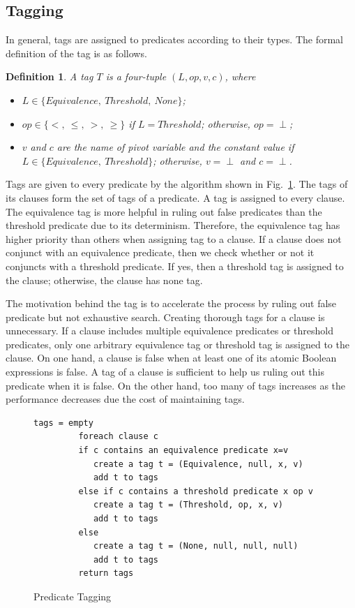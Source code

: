 \documentclass[preprint]{sigplanconf}
\newtheorem{definition}{Definition}
\begin{document}
\subsection{Tagging}
In general, tags are assigned to predicates according to their types. The 
formal definition of the tag is as follows. 
\begin{definition}
   A tag $T$ is a four-tuple $(L, op, v, c)$, where  
   \begin{itemize}
      \item $L \in \{Equivalence,\ Threshold,\ None\}$;
      \item $op \in \{<,\ \le,\ >,\ \ge\}$ if $L = Threshold$; otherwise, 
         $op = \perp$;
      \item $v$ and $c$ are the name of pivot variable and the constant
         value if $L \in \{Equivalence,\ Threshold\}$; otherwise, $v = \perp$
         and $c = \perp$.
   \end{itemize}
\end{definition}
Tags are given to every predicate by the algorithm shown in
Fig.~\ref{fig:tagging}. The tags of its clauses form the set of tags of a
predicate. A tag is assigned to every clause. The equivalence tag is more
helpful in ruling out false predicates than the threshold predicate due to its
determinism. Therefore, the equivalence tag has higher priority than others 
when assigning tag to a clause. If a clause does not conjunct with an
equivalence predicate, then we check whether or not it conjuncts with a 
threshold predicate. If yes, then a threshold tag is assigned to the clause; 
otherwise, the clause has none tag. 

The motivation behind the tag is to accelerate the process by ruling out false 
predicate but not exhaustive search. Creating thorough tags for a clause is
unnecessary. If a clause includes multiple equivalence predicates or threshold 
predicates, only one arbitrary equivalence tag or threshold tag is assigned to 
the clause. On one hand, a clause is false when at least one of its atomic 
Boolean expressions is false. A tag of a clause is sufficient to help us ruling 
out this predicate when it is false. On the other hand, too many of tags 
increases as the performance decreases due the cost of maintaining tags. 

\begin{figure}[ht!]
    \begin{Verbatim}[fontsize=\footnotesize,gobble=8,frame=lines,
            framesep=3mm]
         tags = empty
         foreach clause c 
         if c contains an equivalence predicate x=v
            create a tag t = (Equivalence, null, x, v)
            add t to tags
         else if c contains a threshold predicate x op v
            create a tag t = (Threshold, op, x, v)
            add t to tags
         else 
            create a tag t = (None, null, null, null)
            add t to tags
         return tags
    \end{Verbatim}
  \caption{Predicate Tagging}
  \label{fig:tagging}
\end{figure}
\end{document}
